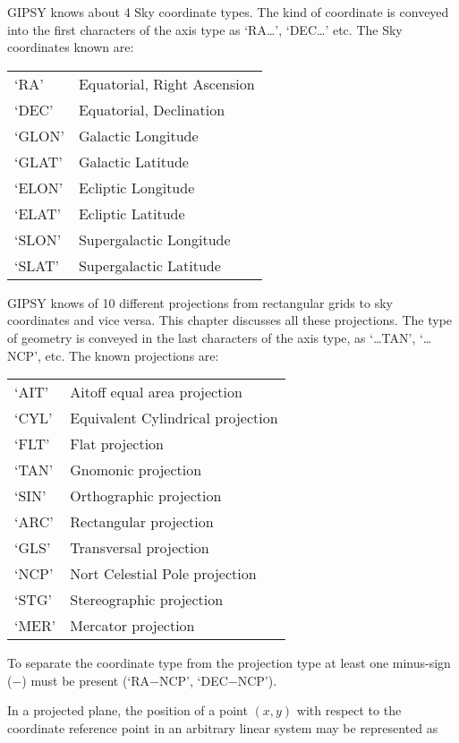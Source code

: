
GIPSY knows about 4 Sky coordinate types.  The kind of coordinate is
conveyed into the first characters of the axis type as `RA{\dots}',
`DEC{\dots}' etc. The Sky coordinates known are:

\medskip
\begin{tabular}{l l}
`RA'&Equatorial, Right Ascension\\
`DEC'&Equatorial, Declination\\
`GLON'&Galactic Longitude\\
`GLAT'&Galactic Latitude\\
`ELON'&Ecliptic Longitude\\
`ELAT'&Ecliptic Latitude\\
`SLON'&Supergalactic Longitude\\
`SLAT'&Supergalactic Latitude\\
\end{tabular}
\medskip

GIPSY knows of 10 different projections from rectangular grids to sky
coordinates and vice versa.  This chapter discusses all these
projections.  The type of geometry is conveyed in the last characters of
the axis type, as `{\dots}TAN', `{\dots}NCP', etc.  The known
projections are:

\medskip
\begin{tabular}{l l}
`AIT'&Aitoff equal area projection\\
`CYL'&Equivalent Cylindrical projection\\
`FLT'&Flat projection\\
`TAN'&Gnomonic projection\\
`SIN'&Orthographic projection\\
`ARC'&Rectangular projection\\
`GLS'&Transversal projection\\
`NCP'&Nort Celestial Pole projection\\
`STG'&Stereographic projection\\
`MER'&Mercator projection\\
\end{tabular}
\medskip

To separate the coordinate type from the projection type at least one
minus-sign ($-$) must be present (`RA$-$NCP', `DEC$-$NCP'). 

In a projected plane, the position of a point $(x,y)$ with respect to
the coordinate reference point in an arbitrary linear system may be
represented as

